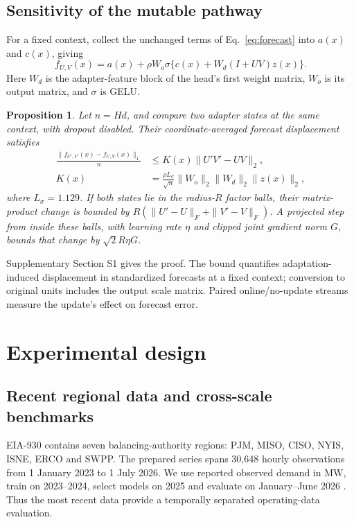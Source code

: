 \documentclass[final,5p,times]{elsarticle}
\newtheorem{proposition}{Proposition}
\begin{document}
\subsection{Sensitivity of the mutable pathway}
For a fixed context, collect the unchanged terms of Eq.~\ref{eq:forecast} into $a(x)$ and $c(x)$, giving
\begin{equation}
 f_{U,V}(x)=a(x)+\rho W_o\sigma\{c(x)+W_d(I+UV)z(x)\}.
\end{equation}
Here $W_d$ is the adapter-feature block of the head's first weight matrix, $W_o$ is its output matrix, and $\sigma$ is GELU.

\begin{proposition}
Let $n=Hd$, and compare two adapter states at the same context, with dropout disabled. Their coordinate-averaged forecast displacement satisfies
\begin{align}
 \frac{\|f_{U',V'}(x)-f_{U,V}(x)\|_1}{n}
 &\leq K(x)\|U'V'-UV\|_2,\\
 K(x)&=\frac{\rho L_\sigma}{\sqrt n}\|W_o\|_2\|W_d\|_2\|z(x)\|_2,
\end{align}
where $L_\sigma=1.129$. If both states lie in the radius-$R$ factor balls, their matrix-product change is bounded by $R(\|U'-U\|_F+\|V'-V\|_F)$. A projected step from inside these balls, with learning rate $\eta$ and clipped joint gradient norm $G$, bounds that change by $\sqrt2R\eta G$.
\end{proposition}

Supplementary Section S1 gives the proof. The bound quantifies adaptation-induced displacement in standardized forecasts at a fixed context; conversion to original units includes the output scale matrix. Paired online/no-update streams measure the update's effect on forecast error.

\section{Experimental design}
\subsection{Recent regional data and cross-scale benchmarks}
EIA-930 contains seven balancing-authority regions: PJM, MISO, CISO, NYIS, ISNE, ERCO and SWPP. The prepared series spans 30,648 hourly observations from 1 January 2023 to 1 July 2026. We use reported observed demand in MW, train on 2023--2024, select models on 2025 and evaluate on January--June 2026 \cite{eia9302026}. Thus the most recent data provide a temporally separated operating-data evaluation.
\end{document}
